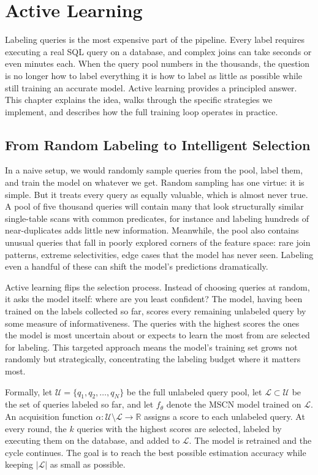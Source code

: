 \chapter{Active Learning}
\label{chap:active_learning}
\pagestyle{plain}

Labeling queries is the most expensive part of the pipeline. Every label requires executing a real SQL query on a database, and complex joins can take seconds or even minutes each. When the query pool numbers in the thousands, the question is no longer how to label everything it is how to label as little as possible while still training an accurate model. Active learning provides a principled answer. This chapter explains the idea, walks through the specific strategies we implement, and describes how the full training loop operates in practice.


\section{From Random Labeling to Intelligent Selection}

In a naive setup, we would randomly sample queries from the pool, label them, and train the model on whatever we get. Random sampling has one virtue: it is simple. But it treats every query as equally valuable, which is almost never true. A pool of five thousand queries will contain many that look structurally similar single-table scans with common predicates, for instance and labeling hundreds of near-duplicates adds little new information. Meanwhile, the pool also contains unusual queries that fall in poorly explored corners of the feature space: rare join patterns, extreme selectivities, edge cases that the model has never seen. Labeling even a handful of these can shift the model's predictions dramatically.

Active learning flips the selection process. Instead of choosing queries at random, it asks the model itself: where are you least confident? The model, having been trained on the labels collected so far, scores every remaining unlabeled query by some measure of informativeness. The queries with the highest scores the ones the model is most uncertain about or expects to learn the most from are selected for labeling. This targeted approach means the model's training set grows not randomly but strategically, concentrating the labeling budget where it matters most.

Formally, let $\mathcal{U} = \{q_1, q_2, \ldots, q_N\}$ be the full unlabeled query pool, let $\mathcal{L} \subset \mathcal{U}$ be the set of queries labeled so far, and let $f_\theta$ denote the MSCN model trained on $\mathcal{L}$. An acquisition function $\alpha: \mathcal{U} \setminus \mathcal{L} \rightarrow \mathbb{R}$ assigns a score to each unlabeled query. At every round, the $k$ queries with the highest scores are selected, labeled by executing them on the database, and added to $\mathcal{L}$. The model is retrained and the cycle continues. The goal is to reach the best possible estimation accuracy while keeping $|\mathcal{L}|$ as small as possible.


